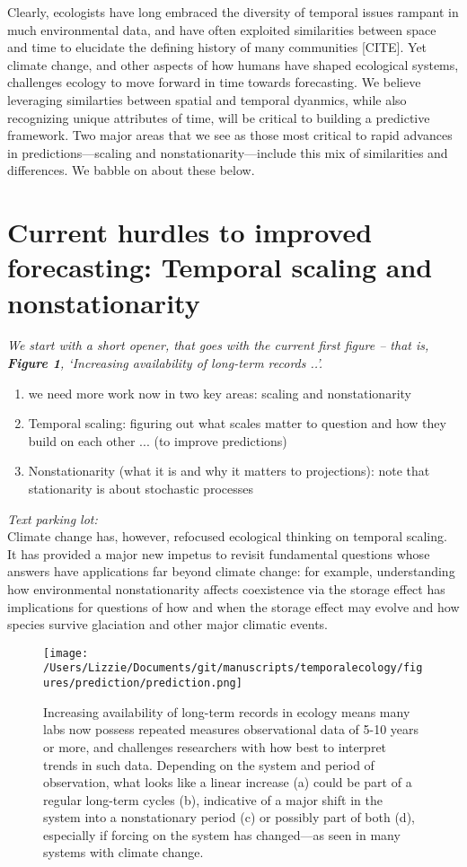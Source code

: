 \documentclass[11pt,a4paper,oneside]{article}
\begin{document}
Clearly, ecologists have long embraced the diversity of temporal issues rampant in much environmental data, and have often exploited similarities between space and time to elucidate the defining history of many communities [CITE]. Yet climate change, and other aspects of how humans have shaped ecological systems, challenges ecology to move forward in time towards forecasting. We believe leveraging similarties between spatial and temporal dyanmics, while also recognizing unique attributes of time, will be critical to building a predictive framework. Two major areas that we see as those most critical to rapid advances in predictions---scaling and nonstationarity---include this mix of similarities and differences. We babble on about these below.

\section{Current hurdles to improved forecasting: Temporal scaling and nonstationarity}
\noindent \emph{We start with a short opener, that goes with the current first figure -- that is, {\bf Figure 1}, `Increasing availability of long-term records ..'.}\\

\begin{enumerate}
\item we need more work now in two key areas: scaling and nonstationarity
\item Temporal scaling: figuring out what scales matter to question and how they build on each other ... (to improve predictions)
\item Nonstationarity (what it is and why it matters to projections): note that stationarity is about stochastic processes
\end{enumerate}

\noindent \emph{Text parking lot:}\\
Climate change has, however, refocused ecological thinking on temporal scaling. It has provided a major new impetus to revisit fundamental questions whose answers have applications far beyond climate change: for example, understanding how environmental nonstationarity affects coexistence via the storage effect has implications for questions of how and when the storage effect may evolve and how species survive glaciation and other major climatic events. 

\begin{figure}[h!]
\centering
\noindent \texttt{[image: /Users/Lizzie/Documents/git/manuscripts/temporalecology/figures/prediction/prediction.png]}
\caption{Increasing availability of long-term records in ecology means many labs now possess repeated measures observational data of 5-10 years or more, and challenges researchers with how best to interpret trends in such data. Depending on the system and period of observation, what looks like a linear increase (a) could be part of a regular long-term cycles (b), indicative of a major shift in the system into a nonstationary period (c) or possibly part of both (d), especially if forcing on the system has changed---as seen in many systems with climate change.}
\end{figure}
\end{document}
